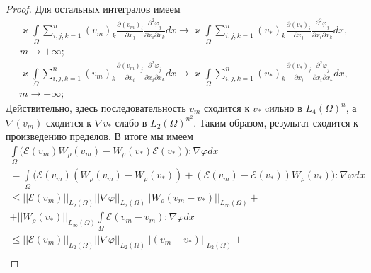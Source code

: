 \begin{proof}
    Для остальных интегралов имеем
    \begin{equation*}
        \begin{gathered}
            \varkappa \int\limits_{\Omega}\sum_{i,j,k=1}^n (v_m)_k
            \frac{\partial (v_m)_i}{\partial x_j} \frac{\partial^2 \varphi_j}{\partial x_i \partial x_k} dx \rightarrow
            \varkappa \int\limits_{\Omega}\sum_{i,j,k=1}^n (v_*)_k
            \frac{\partial (v_*)_i}{\partial x_j} \frac{\partial^2 \varphi_j}{\partial x_i \partial x_k} dx,\\
            m \rightarrow +\infty;
        \end{gathered}
    \end{equation*}
    \begin{equation*}
        \begin{gathered}
            \varkappa \int\limits_{\Omega}\sum_{i,j,k=1}^n (v_m)_k
            \frac{\partial (v_m)_j}{\partial x_i} \frac{\partial^2 \varphi_j}{\partial x_i \partial x_k} dx \rightarrow
            \varkappa \int\limits_{\Omega}\sum_{i,j,k=1}^n (v_*)_k
            \frac{\partial (v_*)_j}{\partial x_i} \frac{\partial^2 \varphi_j}{\partial x_i \partial x_k} dx,\\
            m \rightarrow +\infty;
        \end{gathered}
    \end{equation*}
    Действительно, здесь последовательность $v_m$ сходится к $v_*$ cильно в $L_4(\Omega)^n$,
    а $\nabla(v_m)$ сходится к $\nabla v_*$ слабо в $L_2(\Omega)^{n^2}$.
    Таким образом, результат сходится к произведению пределов. В итоге мы имеем
    \begin{equation*}
        \begin{gathered}
            \int\limits_{\Omega} \bigg(\mathcal{E}(v_m)W_\rho (v_m) - W_\rho(v_*)\mathcal{E}(v_*)\bigg): \nabla\varphi dx\\
            = \int\limits_{\Omega} \bigg(\mathcal{E}(v_m)(W_\rho (v_m) - W_\rho(v_*))
            + (\mathcal{E}(v_m) - \mathcal{E}(v_*))W_\rho (v_*)\bigg): \nabla\varphi dx\\
            \leq ||\mathcal{E}(v_m)||_{L_2(\Omega)}||\nabla\varphi||_{L_2(\Omega)}||W_\rho(v_m - v_*)||_{L_\infty(\Omega)} +\\
            + ||W_\rho(v_*)||_{L_\infty(\Omega)} \int\limits_{\Omega}\mathcal{E}(v_m - v_m): \nabla\varphi dx\\
            \leq ||\mathcal{E}(v_m)||_{L_2(\Omega)}||\nabla\varphi||_{L_2(\Omega)}||(v_m - v_*)||_{L_2(\Omega)} +\\

\end{gathered}
\end{equation*}
\end{proof}
